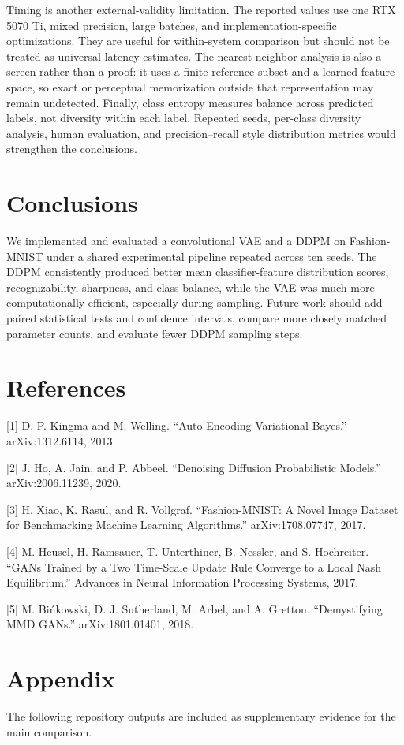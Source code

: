 \documentclass{article}
\begin{document}
Timing is another external-validity limitation. The reported values use one RTX 5070 Ti, mixed precision, large batches, and implementation-specific optimizations. They are useful for within-system comparison but should not be treated as universal latency estimates. The nearest-neighbor analysis is also a screen rather than a proof: it uses a finite reference subset and a learned feature space, so exact or perceptual memorization outside that representation may remain undetected. Finally, class entropy measures balance across predicted labels, not diversity within each label. Repeated seeds, per-class diversity analysis, human evaluation, and precision--recall style distribution metrics would strengthen the conclusions.

\section{Conclusions}
We implemented and evaluated a convolutional VAE and a DDPM on Fashion-MNIST under a shared experimental pipeline repeated across ten seeds. The DDPM consistently produced better mean classifier-feature distribution scores, recognizability, sharpness, and class balance, while the VAE was much more computationally efficient, especially during sampling. Future work should add paired statistical tests and confidence intervals, compare more closely matched parameter counts, and evaluate fewer DDPM sampling steps.

\section*{References}
\small
[1] D. P. Kingma and M. Welling. ``Auto-Encoding Variational Bayes.'' arXiv:1312.6114, 2013.

[2] J. Ho, A. Jain, and P. Abbeel. ``Denoising Diffusion Probabilistic Models.'' arXiv:2006.11239, 2020.

[3] H. Xiao, K. Rasul, and R. Vollgraf. ``Fashion-MNIST: A Novel Image Dataset for Benchmarking Machine Learning Algorithms.'' arXiv:1708.07747, 2017.

[4] M. Heusel, H. Ramsauer, T. Unterthiner, B. Nessler, and S. Hochreiter. ``GANs Trained by a Two Time-Scale Update Rule Converge to a Local Nash Equilibrium.'' Advances in Neural Information Processing Systems, 2017.

[5] M. Bi\'nkowski, D. J. Sutherland, M. Arbel, and A. Gretton. ``Demystifying MMD GANs.'' arXiv:1801.01401, 2018.

\section*{Appendix}
The following repository outputs are included as supplementary evidence for the main comparison.
\end{document}
